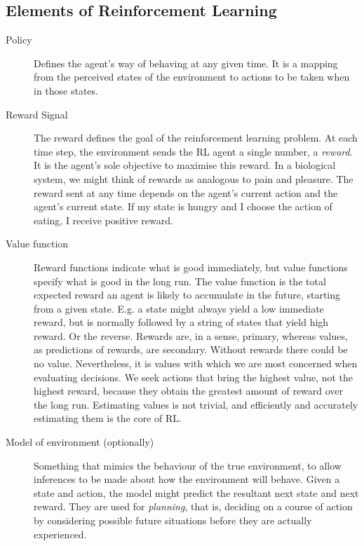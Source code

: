 \subsection{Elements of Reinforcement Learning}
\begin{description}
	\item[Policy] Defines the agent's way of behaving at any given time. It is a mapping from the perceived states of the environment to actions to be taken when in those states.
	\item[Reward Signal] The reward defines the goal of the reinforcement learning problem. At each time step, the environment sends the RL agent a single number, a \textit{reward}. It is the agent's sole objective to maximise this reward. In a biological system, we might think of rewards as analogous to pain and pleasure. The reward sent at any time depends on the agent's current action and the agent's current state. If my state is hungry and I choose the action of eating, I receive positive reward.
	\item[Value function] Reward functions indicate what is good immediately, but value functions specify what is good in the long run. The value function is the total expected reward an agent is likely to accumulate in the future, starting from a given state. E.g. a state might always yield a low immediate reward, but is normally followed by a string of states that yield high reward. Or the reverse. Rewards are, in a sense, primary, whereas values, as predictions of rewards, are secondary. Without rewards there could be no value. Nevertheless, it is values with which we are most concerned when evaluating decisions. We seek actions that bring the highest value, not the highest reward, because they obtain the greatest amount of reward over the long run. Estimating values is not trivial, and efficiently and accurately estimating them is the core of RL.
	\item[Model of environment (optionally)] Something that mimics the behaviour of the true environment, to allow inferences to be made about how the environment will behave. Given a state and action, the model might predict the resultant next state and next reward. They are used for \textit{planning}, that is, deciding on a course of action by considering possible future situations before they are actually experienced. 
\end{description}

	
	
	
	
